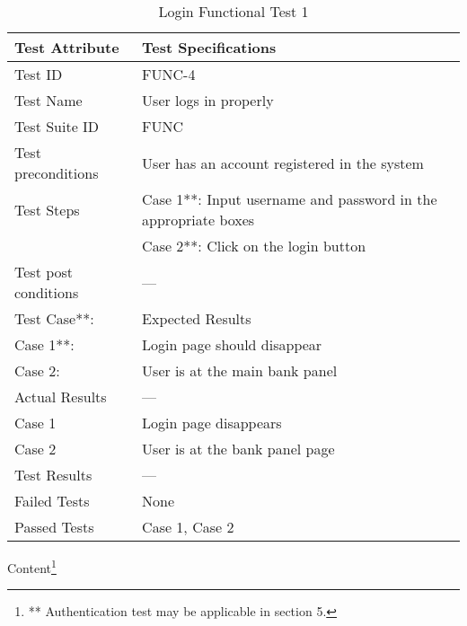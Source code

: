 \documentclass{article}
\begin{document}
\begin{table}[htbp]
\begin{center}
\begin{tabular}{|l | l|}
\hline
Test Attribute & Test Specifications \\
\hline
Test ID & FUNC-4 \\
\hline
Test Name  & User logs in properly \\
\hline
Test Suite  ID & FUNC \\
\hline
Test preconditions & User has an account registered in the system \\
\hline
Test Steps & Case 1**: Input username and password in the appropriate boxes \\
\hline
  & Case 2**: Click on the login button \\
\hline
Test post conditions & --- \\
\hline
Test Case**: & Expected Results\\
\hline
Case 1**:  &  Login page should disappear\\
\hline
Case 2: &  User is at the main bank panel  \\
\hline
Actual Results & ---\\
\hline
Case 1  &  Login page disappears\\
\hline
Case 2 &  User is at the bank panel page  \\
\hline
Test Results & ---\\
\hline
Failed Tests & None\\
\hline
Passed Tests & Case 1, Case 2\\
\hline
\end{tabular}
\end{center}
\caption{Login Functional Test 1}
Content\footnote{** Authentication test may be applicable in section 5.}
\end{table}
\label{table:2d}
\end{document}
